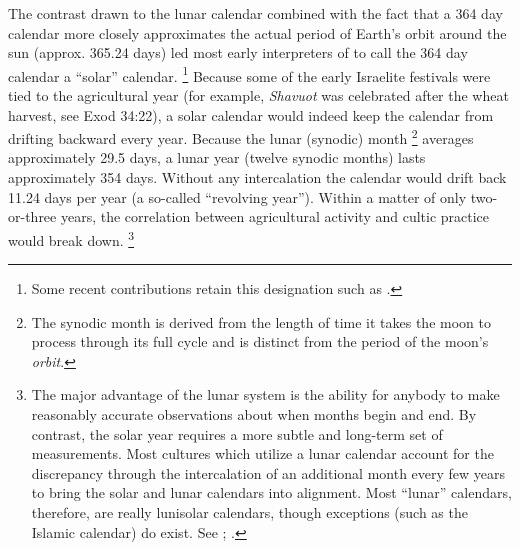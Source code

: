 
\noindent
The contrast drawn to the lunar calendar combined with the fact that a 364 day calendar more closely approximates the actual period of Earth's orbit around the sun (approx. 365.24 days) led most early interpreters of \jub to call the 364 day calendar a ``solar'' calendar.%
    \footnote{Some recent contributions retain this designation such as \cite[10]{stern2001}.}
Because some of the early Israelite festivals were tied to the agricultural year (for example, \emph{Shavuot} was celebrated after the wheat harvest, see Exod 34:22), a solar calendar would indeed keep the calendar from drifting backward every year. Because the lunar (synodic) month%
    \footnote{The synodic month is derived from the length of time it takes the moon to process through its full cycle and is distinct from the period of the moon's \emph{orbit}.}
averages approximately 29.5 days, a lunar year (twelve synodic months) lasts approximately 354 days. Without any intercalation the calendar would drift back 11.24 days per year (a so-called ``revolving year''). Within a matter of only two-or-three years, the correlation between agricultural activity and cultic practice would break down.%
    \footnote{The major advantage of the lunar system is the ability for anybody to make reasonably accurate observations about when months begin and end. By contrast, the solar year requires a more subtle and long-term set of measurements. Most cultures which utilize a lunar calendar account for the discrepancy through the intercalation of an additional month every few years to bring the solar and lunar calendars into alignment. Most ``lunar'' calendars, therefore, are really lunisolar calendars, though exceptions (such as the Islamic calendar) do exist. See
        \cite[214, 238]{glessmer_flint-vanderkam1999}; 
        \cite[37--38]{horowitz_janes1996}.}

